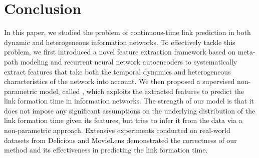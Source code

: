 \section{Conclusion}\label{sec:conclusion}
In this paper, we studied the problem of continuous-time link prediction in both dynamic and heterogeneous information networks. To effectively tackle this problem, we first introduced a novel feature extraction framework based on meta-path modeling and recurrent neural network autoencoders to systematically extract features that take both the temporal dynamics and heterogeneous characteristics of the network into account. We then proposed a supervised non-parametric model, called \npglm, which exploits the extracted features to predict the link formation time in information networks. The strength of our model is that it does not impose any significant assumptions on the underlying distribution of the link formation time given its features, but tries to infer it from the data via a non-parametric approach. Extensive experiments conducted on real-world datasets from Delicious and MovieLens demonstrated the correctness of our method and its effectiveness in predicting the link formation time.